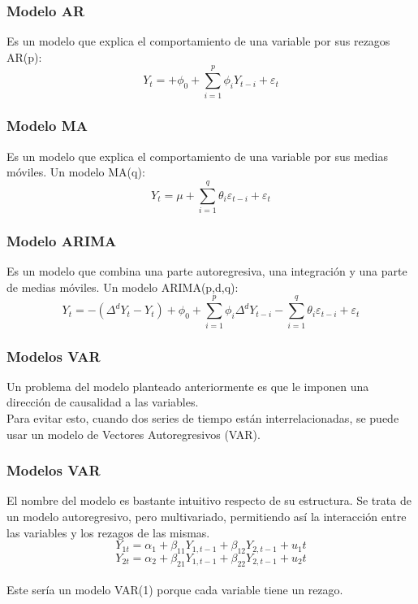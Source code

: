 \documentclass{beamer}
\begin{document}
\begin{frame}
\frametitle{Modelo AR}
\justify
Es un modelo que explica el comportamiento de una variable por sus rezagos AR(p): \\
\vspace{5mm} %
\[
{\displaystyle Y_{t}=+\phi _{0}+\sum _{i=1}^{p}\phi _{i}Y_{t-i}+\varepsilon _{t}}
\]
\end{frame}

\begin{frame}
\frametitle{Modelo MA}
\justify
Es un modelo que explica el comportamiento de una variable por sus medias móviles. Un modelo MA(q): \\
\vspace{5mm} %
\[
{\displaystyle Y_{t}=\mu +\sum _{i=1}^{q}\theta _{i}\varepsilon _{t-i}+\varepsilon _{t}}
\]
\end{frame}


\begin{frame}
\frametitle{Modelo ARIMA}
\justify
Es un modelo que combina una parte autoregresiva, una integración y una parte de medias móviles. Un modelo ARIMA(p,d,q): \\
\vspace{5mm} %
\[
{\displaystyle Y_{t}=-(\Delta ^{d}Y_{t}-Y_{t})+\phi _{0}+\sum _{i=1}^{p}\phi _{i}\Delta ^{d}Y_{t-i}-\sum _{i=1}^{q}\theta _{i}\varepsilon _{t-i}+\varepsilon _{t}}
\]
\end{frame}


\begin{frame}
\frametitle{Modelos VAR}
Un problema del modelo planteado anteriormente es que le imponen una dirección de causalidad a las variables.\\ 
\vspace{5mm} %
Para evitar esto, cuando dos series de tiempo están interrelacionadas, se puede usar un modelo de Vectores Autoregresivos (VAR).\\
\end{frame}

\begin{frame}
\frametitle{Modelos VAR}
El nombre del modelo es bastante intuitivo respecto de su estructura. Se trata de un modelo autoregresivo, pero multivariado, permitiendo así la interacción entre las variables y los rezagos de las mismas.\\ 
\vspace{5mm} %
\[
Y_{1t}=\alpha_1+\beta_{11}Y_{1,t-1}+\beta_{12}Y_{2,t-1}+u_1t
\]
\[
Y_{2t}=\alpha_2+\beta_{21}Y_{1,t-1}+\beta_{22}Y_{2,t-1}+u_2t
\]
\\
\vspace{5mm} %
Este sería un modelo VAR(1) porque cada variable tiene un rezago. 

\end{frame}
\end{document}
